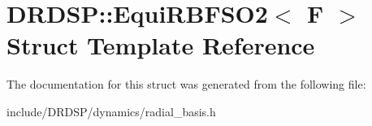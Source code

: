 \hypertarget{struct_d_r_d_s_p_1_1_equi_r_b_f_s_o2}{\section{D\-R\-D\-S\-P\-:\-:Equi\-R\-B\-F\-S\-O2$<$ F $>$ Struct Template Reference}
\label{struct_d_r_d_s_p_1_1_equi_r_b_f_s_o2}
}


The documentation for this struct was generated from the following file\-:\begin{DoxyCompactItemize}
\item 
include/\-D\-R\-D\-S\-P/dynamics/radial\-\_\-basis.\-h\end{DoxyCompactItemize}
